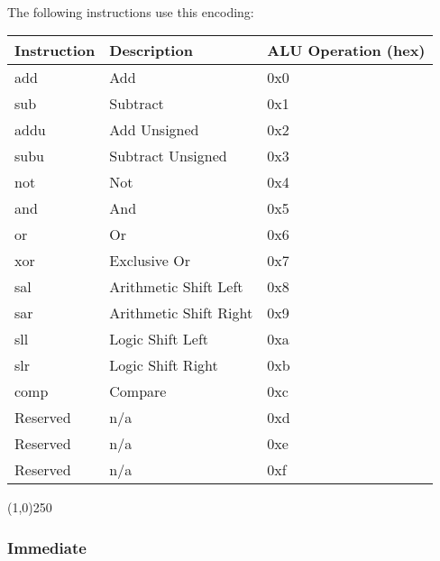 \documentclass[letterpaper, 11pt]{article}
\begin{document}
\paragraph{}The following instructions use this encoding:\\
\begin{center}
	\begin{longtable}{|l|l|l|}\hline
			Instruction & Description 				& ALU Operation (hex) \\ \hline
			add			& Add 						& 0x0 \\ \hline
			sub 		& Subtract					& 0x1 \\ \hline
			addu 		& Add Unsigned 				& 0x2 \\ \hline
			subu		& Subtract Unsigned 		& 0x3 \\ \hline
			not		& Not			& 0x4 \\ \hline
			and			& And						& 0x5 \\ \hline
			or			& Or						& 0x6 \\ \hline
			xor			& Exclusive Or				& 0x7 \\ \hline
			sal			& Arithmetic Shift Left		& 0x8 \\ \hline
			sar			& Arithmetic Shift Right	& 0x9 \\ \hline
			sll			& Logic Shift Left			& 0xa \\ \hline
			slr			& Logic Shift Right			& 0xb \\ \hline
			comp		& Compare					& 0xc \\ \hline
			Reserved	& n/a						& 0xd \\ \hline
			Reserved	& n/a						& 0xe \\ \hline
			Reserved	& n/a						& 0xf \\ \hline

\end{longtable}
\end{center}
\begin{center}
	\line(1,0){250}
\end{center}

\newpage
\subsubsection{Immediate}
\end{document}
